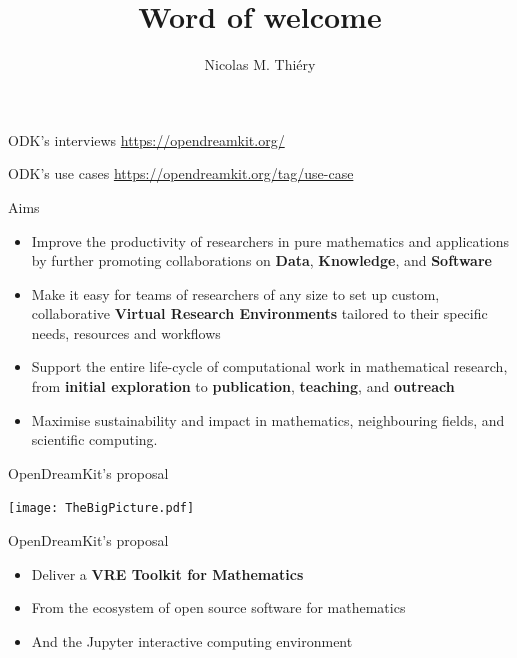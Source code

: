 \documentclass{beamer}
\author{Nicolas M. Thiéry}
\title{Word of welcome}
\begin{document}
\begin{frame}
  \titlepage
\end{frame}

\begin{frame}{ODK's interviews}
  \url{https://opendreamkit.org/}
\end{frame}

\begin{frame}{ODK's use cases}
  \url{https://opendreamkit.org/tag/use-case}
\end{frame}

\begin{frame}{Aims}
  \begin{itemize}
  \item Improve the productivity of researchers in pure mathematics and
    applications by further promoting collaborations on \textbf{Data},
    \textbf{Knowledge}, and \textbf{Software}
  \item Make it easy for teams of researchers of any size to set up
    custom, collaborative \textbf{Virtual Research Environments}
    tailored to their specific needs, resources and workflows
  \item Support the entire life-cycle of computational work in
    mathematical research, from \textbf{initial exploration} to
    \textbf{publication}, \textbf{teaching}, and \textbf{outreach}
  \item Maximise sustainability and impact in mathematics,
    neighbouring fields, and scientific computing.
  \end{itemize}
\end{frame}


\begin{frame}{OpenDreamKit's proposal}\label{our-proposal}
  \centerline{\texttt{[image: TheBigPicture.pdf]}}
\end{frame}

\begin{frame}{OpenDreamKit's proposal}\label{our-proposal}
  \begin{itemize}
  \item Deliver a \textbf{VRE Toolkit for Mathematics}
  \item From the ecosystem of open source software for mathematics
  \item And the Jupyter interactive computing environment
  \end{itemize}
\end{frame}
\end{document}
